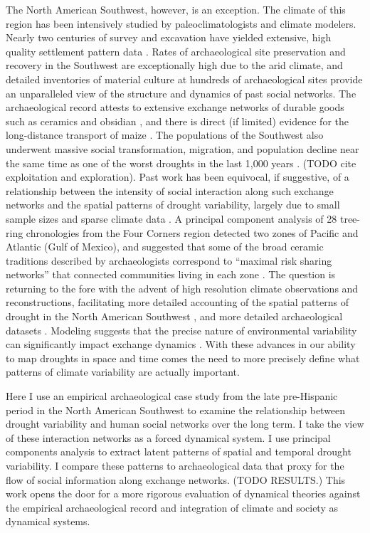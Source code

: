 \documentclass[10pt]{iopart}
\begin{document}
The North American Southwest, however, is an exception. The climate of this region has been intensively studied by paleoclimatologists and climate modelers. Nearly two centuries of survey and excavation have yielded extensive, high quality settlement pattern data \parencite{Hill2004}. Rates of archaeological site preservation and recovery in the Southwest are exceptionally high due to the arid climate, and detailed inventories of material culture at hundreds of archaeological sites provide an unparalleled view of the structure and dynamics of past social networks. The archaeological record attests to extensive exchange networks of durable goods such as ceramics and obsidian \parencite{Taliaferro2010,Mills2013a}, and there is direct (if limited) evidence for the long-distance transport of maize \parencite{Benson2009,Benson2010}. The populations of the Southwest also underwent massive social transformation, migration, and population decline near the same time as one of the worst droughts in the last 1,000 years \parencite{Hill2004}. (TODO cite exploitation and exploration). Past work has been equivocal, if suggestive, of a relationship between the intensity of social interaction along such exchange networks and the spatial patterns of drought variability, largely due to small sample sizes and sparse climate data \parencite{Rautman1993a,Johnson1990ChumashAnalysis}. A principal component analysis of 28 tree-ring chronologies from the Four Corners region detected two zones of Pacific and Atlantic (Gulf of Mexico), and suggested that some of the broad ceramic traditions described by archaeologists correspond to ``maximal risk sharing networks'' that connected communities living in each zone \parencite{Cordell2007}. The question is returning to the fore with the advent of high resolution climate observations and reconstructions, facilitating more detailed accounting of the spatial patterns of drought in the North American Southwest \parencite{Strawhacker2017RiskProvince}, and more detailed archaeological datasets \parencite{Borck2015}. Modeling suggests that the precise nature of environmental variability can significantly impact exchange dynamics \parencite{Freeman2014}. With these advances in our ability to map droughts in space and time comes the need to more precisely define what patterns of climate variability are actually important.

Here I use an empirical archaeological case study from the late pre-Hispanic period in the North American Southwest to examine the relationship between drought variability and human social networks over the long term. I take the view of these interaction networks as a forced dynamical system. I use principal components analysis to extract latent patterns of spatial and temporal drought variability. I compare these patterns to archaeological data that proxy for the flow of social information along exchange networks. (TODO RESULTS.) This work opens the door for a more rigorous evaluation of dynamical theories against the empirical archaeological record and integration of climate and society as dynamical systems. 
\end{document}
